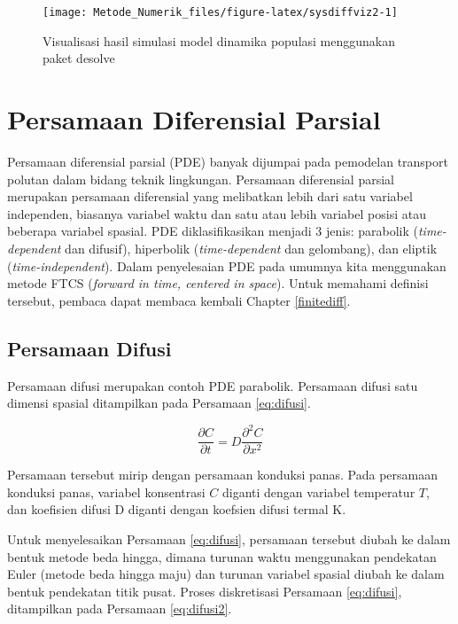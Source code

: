 \documentclass[]{book}
\theoremstyle{definition}
\theoremstyle{definition}
\theoremstyle{definition}
\theoremstyle{remark}
\begin{document}
\begin{figure}

{\centering \texttt{[image: Metode\_Numerik\_files/figure-latex/sysdiffviz2-1]} 

}

\caption{Visualisasi hasil simulasi model dinamika populasi menggunakan paket desolve}\label{fig:sysdiffviz2}
\end{figure}

\hypertarget{pasialdiff}{%
\section{Persamaan Diferensial Parsial}\label{pasialdiff}}

Persamaan diferensial parsial (PDE) banyak dijumpai pada pemodelan transport polutan dalam bidang teknik lingkungan. Persamaan diferensial parsial merupakan persamaan diferensial yang melibatkan lebih dari satu variabel independen, biasanya variabel waktu dan satu atau lebih variabel posisi atau beberapa variabel spasial. PDE diklasifikasikan menjadi 3 jenis: parabolik (\emph{time-dependent} dan difusif), hiperbolik (\emph{time-dependent} dan gelombang), dan eliptik (\emph{time-independent}). Dalam penyelesaian PDE pada umumnya kita menggunakan metode FTCS (\emph{forward in time, centered in space}). Untuk memahami definisi tersebut, pembaca dapat membaca kembali Chapter \ref{finitediff}.

\hypertarget{persamaan-difusi}{%
\subsection{Persamaan Difusi}\label{persamaan-difusi}}

Persamaan difusi merupakan contoh PDE parabolik. Persamaan difusi satu dimensi spasial ditampilkan pada Persamaan \eqref{eq:difusi}.

\begin{equation}
\frac{\partial C}{\partial t}=D\frac{\partial^2C}{\partial x^2}
  \label{eq:difusi}
\end{equation}

Persamaan tersebut mirip dengan persamaan konduksi panas. Pada persamaan konduksi panas, variabel konsentrasi \(C\) diganti dengan variabel temperatur \(T\), dan koefisien difusi D diganti dengan koefsien difusi termal K.

Untuk menyelesaikan Persamaan \eqref{eq:difusi}, persamaan tersebut diubah ke dalam bentuk metode beda hingga, dimana turunan waktu menggunakan pendekatan Euler (metode beda hingga maju) dan turunan variabel spasial diubah ke dalam bentuk pendekatan titik pusat. Proses diskretisasi Persamaan \eqref{eq:difusi}, ditampilkan pada Persamaan \eqref{eq:difusi2}.
\end{document}
